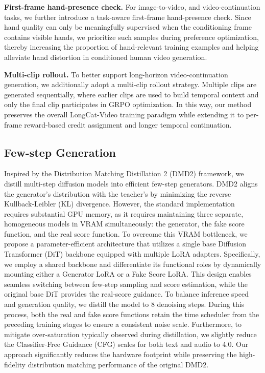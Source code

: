 \textbf{First-frame hand-presence check.} For image-to-video, and video-continuation tasks, we further introduce a task-aware first-frame hand-presence check. Since hand quality can only be meaningfully supervised when the conditioning frame contains visible hands, we prioritize such samples during preference optimization, thereby increasing the proportion of hand-relevant training examples and helping alleviate hand distortion in conditioned human video generation.

\textbf{Multi-clip rollout.} To better support long-horizon video-continuation generation, we additionally adopt a multi-clip rollout strategy. Multiple clips are generated sequentially, where earlier clips are used to build temporal context and only the final clip participates in GRPO optimization. In this way, our method preserves the overall LongCat-Video training paradigm while extending it to per-frame reward-based credit assignment and longer temporal continuation.



\subsection{Few-step Generation}
\label{sec:fsg}

Inspired by the Distribution Matching Distillation 2 (DMD2) \cite{yin2024improved} framework, we distill multi-step diffusion models into efficient few-step generators. DMD2 aligns the generator’s distribution with the teacher's by minimizing the reverse Kullback-Leibler (KL) divergence. However, the standard implementation requires substantial GPU memory, as it requires maintaining three separate, homogeneous models in VRAM simultaneously: the generator, the fake score function, and the real score function. To overcome this VRAM bottleneck, we propose a parameter-efficient architecture that utilizes a single base Diffusion Transformer (DiT) backbone equipped with multiple LoRA adapters. Specifically, we employ a shared backbone and differentiate its functional roles by dynamically mounting either a Generator LoRA or a Fake Score LoRA. This design enables seamless switching between few-step sampling and score estimation, while the original base DiT provides the real-score guidance. To balance inference speed and generation quality, we distill the model to 8 denoising steps. During this process, both the real and fake score functions retain the time scheduler from the preceding training stages to ensure a consistent noise scale. Furthermore, to mitigate over-saturation typically observed during distillation, we slightly reduce the Classifier-Free Guidance (CFG) scales for both text and audio to 4.0. Our approach significantly reduces the hardware footprint while preserving the high-fidelity distribution matching performance of the original DMD2.

